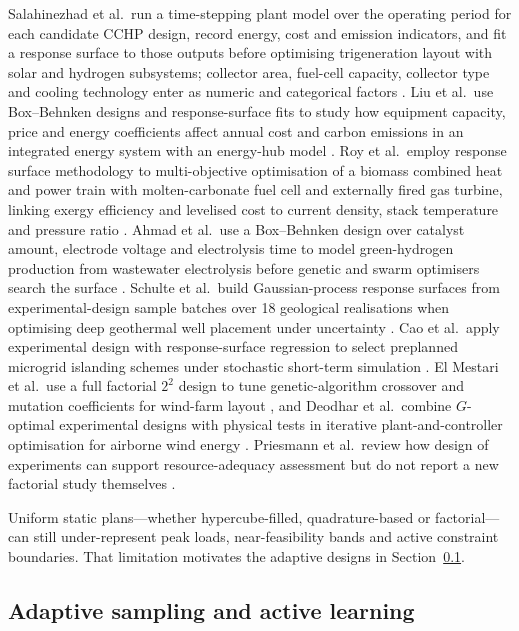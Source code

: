 Salahinezhad et al.\ run a time-stepping plant model over the operating
period for each candidate CCHP design, record energy, cost and
emission indicators, and fit a response surface to those outputs before
optimising trigeneration layout with solar and hydrogen subsystems;
collector area, fuel-cell capacity, collector type and cooling
technology enter as numeric and categorical factors
\cite{Salahinezhad2025}.
Liu et al.\ use Box--Behnken designs and response-surface fits to study
how equipment capacity, price and energy coefficients affect annual cost
and carbon emissions in an integrated energy system with an energy-hub
model \cite{Liu2025__4}. Roy et al.\ employ response surface
methodology to multi-objective optimisation of a biomass combined heat
and power train with molten-carbonate fuel cell and externally fired gas
turbine, linking exergy efficiency and levelised cost to current density,
stack temperature and pressure ratio \cite{Roy2023}. Ahmad et al.\ use a
Box--Behnken design over catalyst amount, electrode voltage and
electrolysis time to model green-hydrogen production from wastewater
electrolysis before genetic and swarm optimisers search the surface
\cite{Ahmad202451}. Schulte et al.\ build Gaussian-process response
surfaces from experimental-design sample batches over 18 geological
realisations when optimising deep geothermal well placement under
uncertainty \cite{Schulte2020}. Cao et al.\ apply experimental design with
response-surface regression to select preplanned microgrid islanding
schemes under stochastic short-term simulation \cite{Cao2017}. El
Mestari et al.\ use a full factorial $2^2$ design to tune genetic-algorithm
crossover and mutation coefficients for wind-farm layout
\cite{El Mestari2025}, and Deodhar et al.\ combine $G$-optimal experimental
designs with physical tests in iterative plant-and-controller optimisation
for airborne wind energy \cite{Deodhar2018}. Priesmann et al.\ review how
design of experiments can support resource-adequacy assessment but do not
report a new factorial study themselves \cite{Priesmann2024}.

Uniform static plans---whether hypercube-filled, quadrature-based or
factorial---can still under-represent peak loads, near-feasibility bands
and active constraint boundaries. That limitation motivates the adaptive
designs in Section~\ref{sec:doe:adaptive}.

\subsection{Adaptive sampling and active learning}
\label{sec:doe:adaptive}

